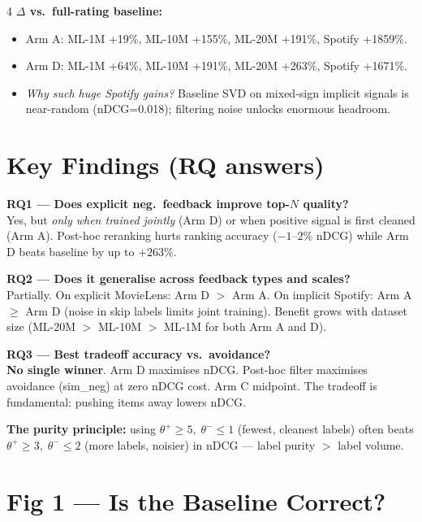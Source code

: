 \documentclass[9pt,a4paper,landscape]{article}
\newcommand{\thr}[2]{$\theta^+\!\geq\!#1,\;\theta^-\!\leq\!#2$}
\begin{document}
\begin{multicols}{4}
\vspace{3pt}
\textbf{$\Delta$ vs.\ full-rating baseline:}
\begin{itemize}
  \item Arm A: ML-1M +19\%, ML-10M +155\%, ML-20M +191\%, Spotify +1859\%.
  \item Arm D: ML-1M +64\%, ML-10M +191\%, ML-20M +263\%, Spotify +1671\%.
  \item \emph{Why such huge Spotify gains?} Baseline SVD on mixed-sign implicit signals is near-random (nDCG=0.018); filtering noise unlocks enormous headroom.
\end{itemize}

\section{Key Findings (RQ answers)}

\textbf{RQ1 — Does explicit neg.\ feedback improve top-$N$ quality?}\\
Yes, but \emph{only when trained jointly} (Arm D) or when positive signal is first cleaned (Arm A). Post-hoc reranking hurts ranking accuracy ($-1$–$2\%$ nDCG) while Arm D beats baseline by up to $+263\%$.

\textbf{RQ2 — Does it generalise across feedback types and scales?}\\
Partially. On explicit MovieLens: Arm D $>$ Arm A. On implicit Spotify: Arm A $\geq$ Arm D (noise in skip labels limits joint training). Benefit grows with dataset size (ML-20M $>$ ML-10M $>$ ML-1M for both Arm A and D).

\textbf{RQ3 — Best tradeoff accuracy vs.\ avoidance?}\\
\textbf{No single winner}. Arm D maximises nDCG. Post-hoc filter maximises avoidance (sim\_neg) at zero nDCG cost. Arm C midpoint. The tradeoff is fundamental: pushing items away lowers nDCG.

\textbf{The purity principle:} using \thr{5}{1} (fewest, cleanest labels) often beats \thr{3}{2} (more labels, noisier) in nDCG — label purity $>$ label volume.

\section{Fig 1 — Is the Baseline Correct?}


\end{multicols}
\end{document}
